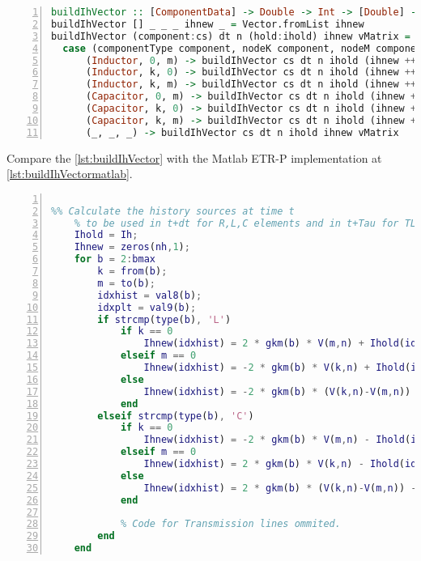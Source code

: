 \begin{lstlisting}[language=Haskell, numbers=left, caption={Building the Ih buffer vector: buildIhVector}, captionpos=b, label={lst:buildIhVector}]
buildIhVector :: [ComponentData] -> Double -> Int -> [Double] -> [Double] -> Matrix Double -> Vector Double
buildIhVector [] _ _ _ ihnew _ = Vector.fromList ihnew
buildIhVector (component:cs) dt n (hold:ihold) ihnew vMatrix =
  case (componentType component, nodeK component, nodeM component) of 
      (Inductor, 0, m) -> buildIhVector cs dt n ihold (ihnew ++ [(2*(condutance component dt)*(Matrix.getElem m n vMatrix) + hold)]) vMatrix
      (Inductor, k, 0) -> buildIhVector cs dt n ihold (ihnew ++ [(-2*(condutance component dt)*(Matrix.getElem k n vMatrix) + hold)]) vMatrix
      (Inductor, k, m) -> buildIhVector cs dt n ihold (ihnew ++ [(-2*(condutance component dt)*((Matrix.getElem k n vMatrix) - (Matrix.getElem m n vMatrix)) + hold)]) vMatrix
      (Capacitor, 0, m) -> buildIhVector cs dt n ihold (ihnew ++ [(-2*(condutance component dt)*(Matrix.getElem m n vMatrix) - hold)]) vMatrix
      (Capacitor, k, 0) -> buildIhVector cs dt n ihold (ihnew ++ [(2*(condutance component dt)*(Matrix.getElem k n vMatrix) - hold)]) vMatrix
      (Capacitor, k, m) -> buildIhVector cs dt n ihold (ihnew ++ [(2*(condutance component dt)*((Matrix.getElem k n vMatrix) - (Matrix.getElem m n vMatrix)) - hold)]) vMatrix
      (_, _, _) -> buildIhVector cs dt n ihold ihnew vMatrix
\end{lstlisting}


Compare the \cref{lst:buildIhVector} with the Matlab ETR-P implementation at \cref{lst:buildIhVectormatlab}.

\begin{lstlisting}[language=Matlab, numbers=left, caption={Ih vector buffer in Matlab ETR-P}, captionpos=b, label={lst:buildIhVectormatlab}]

%% Calculate the history sources at time t
    % to be used in t+dt for R,L,C elements and in t+Tau for TL
    Ihold = Ih;
    Ihnew = zeros(nh,1);
    for b = 2:bmax
        k = from(b);
        m = to(b);
        idxhist = val8(b);
        idxplt = val9(b);
        if strcmp(type(b), 'L')
            if k == 0
                Ihnew(idxhist) = 2 * gkm(b) * V(m,n) + Ihold(idxhist);
            elseif m == 0
                Ihnew(idxhist) = -2 * gkm(b) * V(k,n) + Ihold(idxhist);
            else
                Ihnew(idxhist) = -2 * gkm(b) * (V(k,n)-V(m,n)) + Ihold(idxhist);
            end
        elseif strcmp(type(b), 'C')
            if k == 0
                Ihnew(idxhist) = -2 * gkm(b) * V(m,n) - Ihold(idxhist);
            elseif m == 0
                Ihnew(idxhist) = 2 * gkm(b) * V(k,n) - Ihold(idxhist);
            else
                Ihnew(idxhist) = 2 * gkm(b) * (V(k,n)-V(m,n)) - Ihold(idxhist);
            end

            % Code for Transmission lines ommited.
        end
    end

\end{lstlisting}


